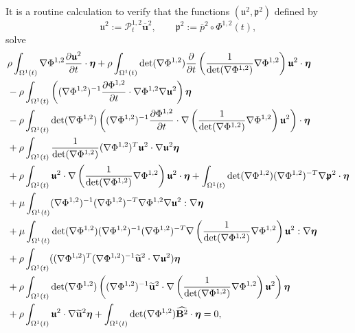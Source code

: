 \documentclass[a4paper]{amsart}
\numberwithin{equation}{section}
\newcommand{\ddt}[1]{\frac{\partial #1}{\partial t}}
\newcommand{\grad}{\nabla}
\theoremstyle{plain}
\newcommand{\mbf}[1]{\mathbf{#1}}
\newcommand{\utwo}{\boldsymbol{\mathfrak{u}}^2}
\newcommand{\ptwo}{\boldsymbol{\mathfrak{p}}^2}
\begin{document}
    It is a routine calculation to verify that the functions $(\utwo, \ptwo)$ defined by
    \[\utwo := \mathcal{P}_t^{1,2} \overline{\mbf{u}}^2, \qquad \ptwo := \overline{p}^2 \circ \Phi^{1,2}(t)  ,\]
    solve
    \begin{align}
        &\rho \int_{\Omega^1(t)} \grad \Phi^{1,2} \ddt{\utwo} \cdot \boldsymbol{\eta} + \rho \int_{\Omega^1(t)} \det(\grad \Phi^{1,2}) \ddt{}\left( \frac{1}{\det(\grad \Phi^{1,2})} \grad \Phi^{1,2}\right) \utwo \cdot \boldsymbol{\eta} \notag\\
        &- \rho\int_{\Omega^1(t)}\left((\grad \Phi^{1,2})^{-1}\ddt{\Phi^{1,2}} \cdot \grad \Phi^{1,2} \grad \utwo\right) \boldsymbol{\eta}\notag\\
        &- \rho\int_{\Omega^1(t)}\det(\grad \Phi^{1,2})\left((\grad \Phi^{1,2})^{-1}\ddt{\Phi^{1,2}} \cdot \grad \left( \frac{1}{\det(\grad \Phi^{1,2})} \grad \Phi^{1,2} \right) \utwo \right)\cdot \boldsymbol{\eta}\notag\\
        &+ \rho \int_{\Omega^1(t)} \frac{1}{\det(\grad \Phi^{1,2})} (\grad \Phi^{1,2} )^T \utwo \cdot \grad \utwo \boldsymbol{\eta}\notag\\
        &+ \rho \int_{\Omega^1(t)} \utwo \cdot \grad \left( \frac{1}{\det(\grad \Phi^{1,2})} \grad \Phi^{1,2} \right) \utwo \cdot \boldsymbol{\eta} + \int_{\Omega^1(t)} \det(\grad \Phi^{1,2}) (\grad \Phi^{1,2})^{-T}\grad\ptwo \cdot \boldsymbol{\eta} \label{contraction pf3}\\
        &+ \mu\int_{\Omega^1(t)} (\grad \Phi^{1,2})^{-1} (\grad \Phi^{1,2})^{-T} \grad \Phi^{1,2} \grad \utwo : \grad \boldsymbol{\eta}\notag\\
        &+ \mu \int_{\Omega^1(t)} \det(\grad\Phi^{1,2}) (\grad \Phi^{1,2})^{-1} (\grad \Phi^{1,2})^{-T} \grad \left(\frac{1}{\det(\grad \Phi^{1,2})} \grad \Phi^{1,2} \right) \utwo : \grad \boldsymbol{\eta}\notag\\
        &+ \rho \int_{\Omega^1(t)} ((\grad \Phi^{1,2})^{T}(\grad \Phi^{1,2})^{-1}\widetilde{\mbf{u}}^2 \cdot \grad \utwo) \boldsymbol{\eta}\notag\\
        &+ \rho \int_{\Omega^1(t)} \det(\grad \Phi^{1,2}) \left((\grad \Phi^{1,2})^{-1} \widetilde{\mbf{u}}^2 \cdot \grad \left(\frac{1}{\det(\grad \Phi^{1,2})} \grad \Phi^{1,2}\right) \utwo \right)\boldsymbol{\eta}\notag\\
        &+ \rho \int_{\Omega^1(t)} \utwo \cdot \grad \widetilde{\mbf{u}}^2 \boldsymbol{\eta} + \int_{\Omega^1(t)} \det(\grad \Phi^{1,2})\widehat{\mbf{B}^2} \cdot \boldsymbol{\eta} = 0, \notag
    \end{align}
\end{document}
